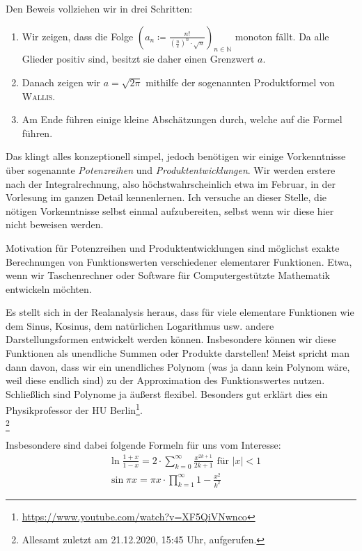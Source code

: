 \documentclass[10pt,fleqn]{article}
\theoremstyle{definition}
\theoremstyle{remark}
\begin{document}
Den Beweis vollziehen wir in drei Schritten:
\begin{enumerate}
    \item Wir zeigen, dass die Folge \(\left(a_n \coloneqq \frac{n!}{\left(\frac{n}{e}\right)^n\cdot\sqrt{n}}\right)_{n\in\mathbb{N}}\) monoton fällt. Da alle Glieder positiv sind, besitzt sie daher einen Grenzwert \(a\).
    \item Danach zeigen wir \(a = \sqrt{2\pi}\) mithilfe der sogenannten Produktformel von \textsc{Wallis}.
    \item Am Ende führen einige kleine Abschätzungen durch, welche auf die Formel führen.
\end{enumerate}
Das klingt alles konzeptionell simpel, jedoch benötigen wir einige Vorkenntnisse über sogenannte \emph{Potenzreihen} und \emph{Produktentwicklungen}. Wir werden erstere nach der Integralrechnung, also höchstwahrscheinlich etwa im Februar, in der Vorlesung im ganzen Detail kennenlernen. Ich versuche an dieser Stelle, die nötigen Vorkenntnisse selbst einmal aufzubereiten, selbst wenn wir diese hier nicht beweisen werden.

Motivation für Potenzreihen und Produktentwicklungen sind möglichst exakte Berechnungen von Funktionswerten verschiedener elementarer Funktionen. Etwa, wenn wir Taschenrechner oder Software für Computergestützte Mathematik entwickeln möchten.

Es stellt sich in der Realanalysis heraus, dass für viele elementare Funktionen wie dem Sinus, Kosinus, dem natürlichen Logarithmus usw. andere Darstellungsformen entwickelt werden können. Insbesondere können wir diese Funktionen als unendliche Summen oder Produkte darstellen! Meist spricht man dann davon, dass wir ein unendliches Polynom (was ja dann kein Polynom wäre, weil diese endlich sind) zu der Approximation des Funktionswertes nutzen. Schließlich sind Polynome ja äußerst flexibel. Besonders gut erklärt dies ein Physikprofessor der HU Berlin\footnote{\url{https://www.youtube.com/watch?v=XF5QiVNwnco}}.\\

{
    \let\thefootnote\relax\footnote{Allesamt zuletzt am 21.12.2020, 15:45 Uhr, aufgerufen.}
}

Insbesondere sind dabei folgende Formeln für uns vom Interesse:
\begin{align}
    &\ln{\frac{1+x}{1-x}} = 2 \cdot \sum_{k=0}^{\infty} \frac{x^{2k+1}}{2k+1} \text{ für } |x| < 1\\
    &\sin{\pi x} = \pi x \cdot \prod_{k=1}^{\infty} 1 - \frac{x^2}{k^2}
\end{align}
\end{document}
